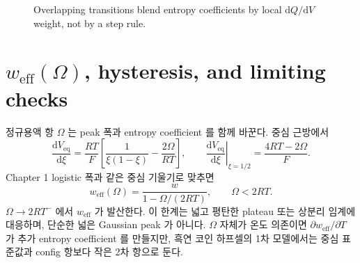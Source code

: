 \documentclass[11pt,a4paper]{article}
\newcommand{\dd}{\mathrm{d}}
\newcommand{\eq}{\mathrm{eq}}
\newcommand{\eff}{\mathrm{eff}}
\begin{document}
\begin{figure}[t]
\centering
{}
\caption{Overlapping transitions blend entropy coefficients by local $\dd Q/\dd V$ weight, not by a step rule.}
\label{fig:overlap}
\end{figure}

\section{\texorpdfstring{$w_{\eff}(\Omega)$}{w eff Omega}, hysteresis, and limiting checks}\label{sec:limits}
정규용액 항 $\Omega$ 는 peak 폭과 entropy coefficient 를 함께 바꾼다. 중심 근방에서
\begin{equation}
\frac{\dd V_{\eq}}{\dd\xi}
=\frac{RT}{F}\left[\frac{1}{\xi(1-\xi)}-\frac{2\Omega}{RT}\right],
\qquad
\left.\frac{\dd V_{\eq}}{\dd\xi}\right|_{\xi=1/2}
=\frac{4RT-2\Omega}{F}.
\label{eq:regularslope}
\end{equation}
Chapter 1 logistic 폭과 같은 중심 기울기로 맞추면
\begin{equation}
\boxed{\;
w_{\eff}(\Omega)=\frac{w}{1-\Omega/(2RT)},\qquad \Omega<2RT.
\;}
\label{eq:weff}
\end{equation}
$\Omega\to2RT^-$ 에서 $w_{\eff}$ 가 발산한다. 이 한계는 넓고 평탄한 plateau 또는 상분리 임계에 대응하며,
단순한 넓은 Gaussian peak 가 아니다. $\Omega$ 자체가 온도 의존이면 $\partial w_{\eff}/\partial T$ 가
추가 entropy coefficient 를 만들지만, 흑연 코인 하프셀의 1차 모델에서는 중심 표준값과 config 항보다
작은 2차 항으로 둔다.
\end{document}
